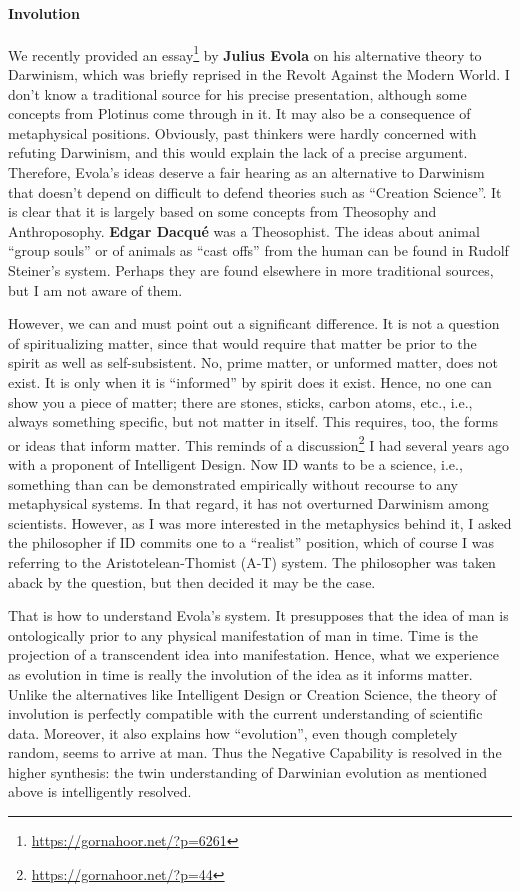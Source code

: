 \paragraph{Involution}


We recently provided an essay\footnote{\url{https://gornahoor.net/?p=6261}} by \textbf{Julius Evola} on his alternative theory to Darwinism, which was briefly reprised in the Revolt Against the Modern World. I don't know a traditional source for his precise presentation, although some concepts from Plotinus come through in it. It may also be a consequence of metaphysical positions. Obviously, past thinkers were hardly concerned with refuting Darwinism, and this would explain the lack of a precise argument. Therefore, Evola's ideas deserve a fair hearing as an alternative to Darwinism that doesn't depend on difficult to defend theories such as ``Creation Science''. It is clear that it is largely based on some concepts from Theosophy and Anthroposophy. \textbf{Edgar Dacqué} was a Theosophist. The ideas about animal ``group souls'' or of animals as ``cast offs'' from the human can be found in Rudolf Steiner's system. Perhaps they are found elsewhere in more traditional sources, but I am not aware of them.

However, we can and must point out a significant difference. It is not a question of spiritualizing matter, since that would require that matter be prior to the spirit as well as self-subsistent. No, prime matter, or unformed matter, does not exist. It is only when it is ``informed'' by spirit does it exist. Hence, no one can show you a piece of matter; there are stones, sticks, carbon atoms, etc., i.e., always something specific, but not matter in itself. This requires, too, the forms or ideas that inform matter. This reminds of a discussion\footnote{\url{https://gornahoor.net/?p=44}} I had several years ago with a proponent of Intelligent Design. Now ID wants to be a science, i.e., something than can be demonstrated empirically without recourse to any metaphysical systems. In that regard, it has not overturned Darwinism among scientists. However, as I was more interested in the metaphysics behind it, I asked the philosopher if ID commits one to a ``realist'' position, which of course I was referring to the Aristotelean-Thomist (A-T) system. The philosopher was taken aback by the question, but then decided it may be the case.

That is how to understand Evola's system. It presupposes that the idea of man is ontologically prior to any physical manifestation of man in time. Time is the projection of a transcendent idea into manifestation. Hence, what we experience as evolution in time is really the involution of the idea as it informs matter. Unlike the alternatives like Intelligent Design or Creation Science, the theory of involution is perfectly compatible with the current understanding of scientific data. Moreover, it also explains how ``evolution'', even though completely random, seems to arrive at man. Thus the Negative Capability is resolved in the higher synthesis: the twin understanding of Darwinian evolution as mentioned above is intelligently resolved.

